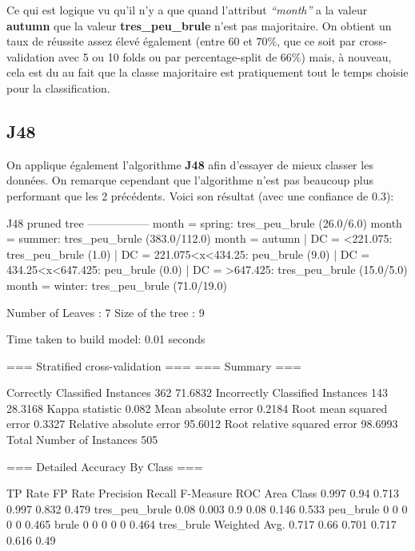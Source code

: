 \documentclass{article}
\begin{document}
\begin{sffamily}
Ce qui est logique vu qu'il n'y a que quand l'attribut \textit{``month''} a la valeur \textbf{autumn} que la valeur 
\textbf{tres\_peu\_brule} n'est pas majoritaire. On obtient un taux de réussite assez élevé également (entre $60$ et $70\%$, que 
ce soit par cross-validation avec 5 ou 10 folds ou par percentage-split de $66\%$) mais, à nouveau, cela est du au fait que la 
classe majoritaire est pratiquement tout le temps choisie pour la classification.

\subsection*{J48}

On applique également l'algorithme \textbf{J48} afin d'essayer de mieux classer les données. On remarque cependant que 
l'algorithme n'est pas beaucoup plus performant que les 2 précédents. Voici son résultat (avec une confiance de $0.3$): 

\begin{center}
	\begin{boxedverbatim}
J48 pruned tree
-----------------
month = spring: tres_peu_brule (26.0/6.0)
month = summer: tres_peu_brule (383.0/112.0)
month = autumn
|   DC = <221.075: tres_peu_brule (1.0)
|   DC = 221.075<x<434.25: peu_brule (9.0)
|   DC = 434.25<x<647.425: peu_brule (0.0)
|   DC = >647.425: tres_peu_brule (15.0/5.0)
month = winter: tres_peu_brule (71.0/19.0)

Number of Leaves  : 	7
Size of the tree : 	9

Time taken to build model: 0.01 seconds

=== Stratified cross-validation ===
=== Summary ===

Correctly Classified Instances         362               71.6832 %
Incorrectly Classified Instances       143               28.3168 %
Kappa statistic                          0.082 
Mean absolute error                      0.2184
Root mean squared error                  0.3327
Relative absolute error                 95.6012 %
Root relative squared error             98.6993 %
Total Number of Instances              505     

=== Detailed Accuracy By Class ===

             TP Rate  FP Rate  Precision  Recall  F-Measure  ROC Area  Class
              0.997    0.94      0.713    0.997     0.832     0.479    tres_peu_brule
              0.08     0.003     0.9      0.08      0.146     0.533    peu_brule
              0        0         0        0         0         0.465    brule
              0        0         0        0         0         0.464    tres_brule
Weighted Avg. 0.717    0.66      0.701    0.717     0.616     0.49 


\end{boxedverbatim}
\end{center}
\end{sffamily}
\end{document}
